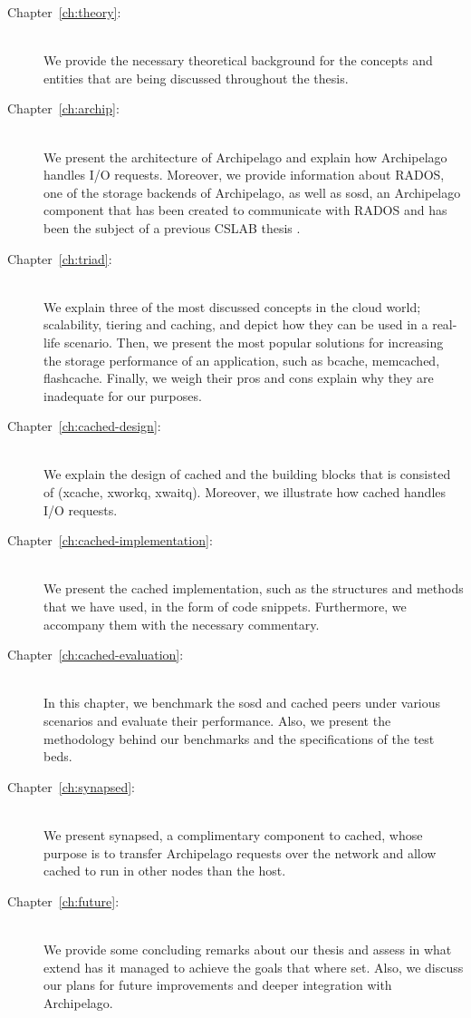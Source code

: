 \begin{description}
\item[Chapter~\ref{ch:theory}:] \hfill \\
	We provide the necessary theoretical background for the concepts and 
	entities that are being discussed throughout the thesis.
\item[Chapter~\ref{ch:archip}:] \hfill \\
	We present the architecture of Archipelago and explain how Archipelago 
	handles I/O requests. Moreover, we provide information about RADOS, one 
	of the storage backends of Archipelago, as well as sosd, an Archipelago 
	component that has been created to communicate with RADOS and has been the 
	subject of a previous CSLAB thesis \cite{sosd}.
\item[Chapter~\ref{ch:triad}:] \hfill \\
	We explain three of the most discussed concepts in the cloud world; 
	scalability, tiering and caching, and depict how they can be used in a 
	real-life scenario. Then, we present the most popular solutions for 
	increasing the storage performance of an application, such as bcache, 
	memcached, flashcache. Finally, we weigh their pros and cons explain 
	why they are inadequate for our purposes.
\item[Chapter~\ref{ch:cached-design}:] \hfill \\
	We explain the design of cached and the building blocks that is 
	consisted of (xcache, xworkq, xwaitq). Moreover, we illustrate how 
	cached handles I/O requests.
\item[Chapter~\ref{ch:cached-implementation}:] \hfill \\
	We present the cached implementation, such as the structures and 
	methods that we have used, in the form of code snippets. Furthermore, 
	we accompany them with the necessary commentary.
\item[Chapter~\ref{ch:cached-evaluation}:] \hfill \\
	In this chapter, we benchmark the sosd and cached peers under various 
	scenarios and evaluate their performance. Also, we present the 
	methodology behind our benchmarks and the specifications of the test 
	beds.
\item[Chapter~\ref{ch:synapsed}:] \hfill \\
	We present synapsed, a complimentary component to cached, whose purpose 
	is to transfer Archipelago requests over the network and allow cached 
	to run in other nodes than the host.
\item[Chapter~\ref{ch:future}:] \hfill \\
	We provide some concluding remarks about our thesis and assess in what 
	extend has it managed to achieve the goals that where set.  Also, we 
	discuss our plans for future improvements and deeper integration with 
	Archipelago.
\end{description}
